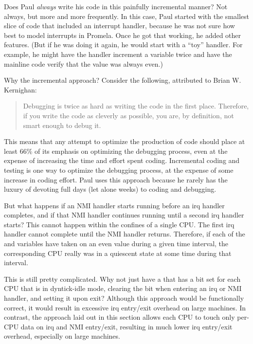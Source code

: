 \QuickQ{}
	Does Paul \emph{always} write his code in this painfully incremental
	manner?
\QuickA{}
	Not always, but more and more frequently.
	In this case, Paul started with the smallest slice of code that
	included an interrupt handler, because he was not sure how best
	to model interrupts in Promela.
	Once he got that working, he added other features.
	(But if he was doing it again, he would start with a ``toy'' handler.
	For example, he might have the handler increment a variable twice and
	have the mainline code verify that the value was always even.)

	Why the incremental approach?
	Consider the following, attributed to Brian W. Kernighan:

	\begin{quote}
		Debugging is twice as hard as writing the code in the first
		place. Therefore, if you write the code as cleverly as possible,
		you are, by definition, not smart enough to debug it.
	\end{quote}

	This means that any attempt to optimize the production of code should
	place at least 66\% of its emphasis on optimizing the debugging process,
	even at the expense of increasing the time and effort spent coding.
	Incremental coding and testing is one way to optimize the debugging
	process, at the expense of some increase in coding effort.
	Paul uses this approach because he rarely has the luxury of
	devoting full days (let alone weeks) to coding and debugging.

\QuickQ{}
	But what happens if an NMI handler starts running before
	an irq handler completes, and if that NMI handler continues
	running until a second irq handler starts?
\QuickA{}
	This cannot happen within the confines of a single CPU.
	The first irq handler cannot complete until the NMI handler
	returns.
	Therefore, if each of the  and 
	variables have taken on an even value during a given time
	interval, the corresponding CPU really was in a quiescent
	state at some time during that interval.

\QuickQ{}
	This is still pretty complicated.
	Why not just have a  that has a bit set for
	each CPU that is in dyntick-idle mode, clearing the bit
	when entering an irq or NMI handler, and setting it upon
	exit?
\QuickA{}
	Although this approach would be functionally correct, it
	would result in excessive irq entry/exit overhead on
	large machines.
	In contrast, the approach laid out in this section allows
	each CPU to touch only per-CPU data on irq and NMI entry/exit,
	resulting in much lower irq entry/exit overhead, especially
	on large machines.

